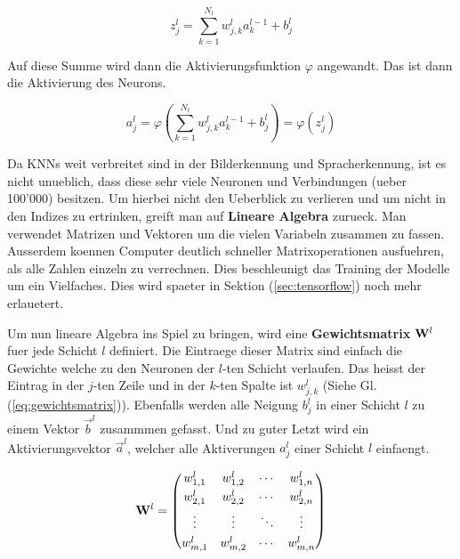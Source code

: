 \documentclass[../main]{subfiles}
\begin{document}
\begin{equation}\label{eq:gewichtete_summe_normal}
  z_j^l = \sum_{k=1}^{N_l} w_{j,k}^l a_k^{l-1} + b_j^l
\end{equation}

Auf diese Summe wird dann die Aktivierungsfunktion $\varphi$ angewandt.
Das ist dann die Aktivierung des Neurons.

\begin{equation}\label{eq:aktivierung_normal}
  a_j^l = \varphi\left(\sum_{k=1}^{N_l} w_{j,k}^l a_k^{l-1} + b_j^l \right) = \varphi \left( z_j^l \right)
\end{equation}
\par\bigskip
Da KNNs weit verbreitet sind in der Bilderkennung und Spracherkennung, ist es
nicht unueblich, dass diese sehr viele Neuronen und Verbindungen (ueber 100'000) besitzen.
Um hierbei nicht den Ueberblick zu verlieren und um nicht in den Indizes zu
ertrinken, greift man auf \textbf{Lineare Algebra} zurueck. Man verwendet
Matrizen und Vektoren um die vielen Variabeln zusammen zu fassen.
Ausserdem koennen Computer deutlich schneller Matrixoperationen ausfuehren, als
alle Zahlen einzeln zu verrechnen. Dies beschleunigt das Training der Modelle um
ein Vielfaches. Dies wird spaeter in Sektion
(\ref{sec:tensorflow}) noch mehr erlauetert.
\par\medskip
Um nun lineare Algebra ins Spiel zu bringen, wird eine \textbf{Gewichtsmatrix}
$\mathbf{W}^l$ fuer jede Schicht $l$ definiert.
Die Eintraege dieser Matrix sind einfach die Gewichte welche zu den Neuronen der
$l$-ten Schicht verlaufen. Das heisst der Eintrag in der $j$-ten Zeile und in
der $k$-ten Spalte ist $w_{j,k}^l$ (Siehe Gl. (\ref{eq:gewichtsmatrix})). Ebenfalls werden alle Neigung $b_j^l$ in
einer Schicht $l$ zu einem Vektor $\vec{b}^l$ zusammmen gefasst. Und zu guter
Letzt wird ein Aktivierungsvektor $\vec{a}^l$, welcher alle Aktiverungen $a_j^l$
einer Schicht $l$ einfaengt.

\begin{equation}\label{eq:gewichtsmatrix}
  \mathbf{W}^l =
  \begin{pmatrix}
    w_{1,1}^l & w_{1,2}^l & \cdots & w_{1,n}^l \\[0.3em]
    w_{2,1}^l & w_{2,2}^l & \cdots & w_{2,n}^l \\[0.3em]
    \vdots & \vdots & \ddots & \vdots \\[0.3em]
    w_{m,1}^l & w_{m,2}^l & \cdots & w_{m,n}^l
  \end{pmatrix}
\end{equation}
\end{document}
